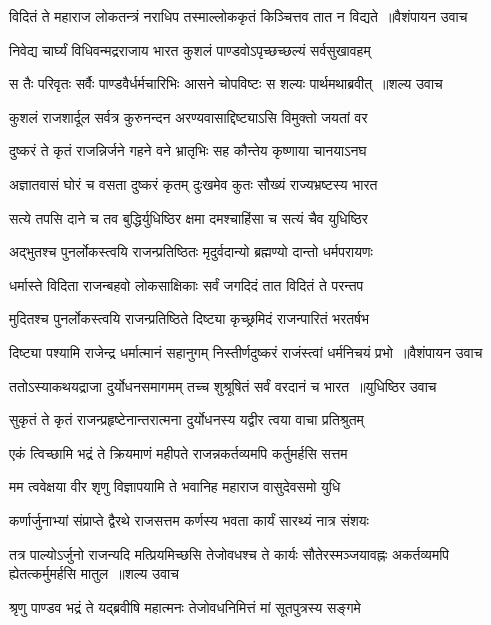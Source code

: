 \threelineshloka
{विदितं ते महाराज लोकतन्त्रं नराधिप}
{तस्माल्लोककृतं किञ्चित्तव तात न विद्यते ॥वैशंपायन उवाच}
{}


\twolineshloka
{निवेद्य चार्घ्यं विधिवन्मद्रराजाय भारत}
{कुशलं पाण्डवोऽपृच्छच्छल्यं सर्वसुखावहम्}


\threelineshloka
{स तैः परिवृतः सर्वैः पाण्डवैर्धर्मचारिभिः}
{आसने चोपविष्टः स शल्यः पार्थमथाब्रवीत् ॥शल्य उवाच}
{}


\twolineshloka
{कुशलं राजशार्दूल सर्वत्र कुरुनन्दन}
{अरण्यवासाद्दिष्ट्याऽसि विमुक्तो जयतां वर}


\twolineshloka
{दुष्करं ते कृतं राजन्निर्जने गहने वने}
{भ्रातृभिः सह कौन्तेय कृष्णाया चानयाऽनघ}


\twolineshloka
{अज्ञातवासं घोरं च वसता दुष्करं कृतम्}
{दुःखमेव कुतः सौख्यं राज्यभ्रष्टस्य भारत}


\twolineshloka
{सत्ये तपसि दाने च तव बुद्धिर्युधिष्ठिर}
{क्षमा दमश्चाहिंसा च सत्यं चैव युधिष्ठिर}


\twolineshloka
{अद्भुतश्च पुनर्लोकस्त्वयि राजन्प्रतिष्ठितः}
{मृदुर्वदान्यो ब्रह्मण्यो दान्तो धर्मपरायणः}


\twolineshloka
{धर्मास्ते विदिता राजन्बहवो लोकसाक्षिकाः}
{सर्वं जगदिदं तात विदितं ते परन्तप}


\twolineshloka
{मुदितश्च पुनर्लोकस्त्वयि राजन्प्रतिष्ठिते}
{दिष्ट्या कृच्छ्रमिदं राजन्पारितं भरतर्षभ}


\threelineshloka
{दिष्ट्या पश्यामि राजेन्द्र धर्मात्मानं सहानुगम्}
{निस्तीर्णदुष्करं राजंस्त्वां धर्मनिचयं प्रभो ॥वैशंपायन उवाच}
{}


\threelineshloka
{ततोऽस्याकथयद्राजा दुर्योधनसमागमम्}
{तच्च शुश्रूषितं सर्वं वरदानं च भारत ॥युधिष्ठिर उवाच}
{}


\twolineshloka
{सुकृतं ते कृतं राजन्प्रहृष्टेनान्तरात्मना}
{दुर्योधनस्य यद्वीर त्वया वाचा प्रतिश्रुतम्}


\twolineshloka
{एकं त्विच्छामि भद्रं ते क्रियमाणं महीपते}
{राजन्नकर्तव्यमपि कर्तुमर्हसि सत्तम}


\twolineshloka
{मम त्ववेक्षया वीर शृणु विज्ञापयामि ते}
{भवानिह महाराज वासुदेवसमो युधि}


\twolineshloka
{कर्णार्जुनाभ्यां संप्राप्ते द्वैरथे राजसत्तम}
{कर्णस्य भवता कार्यं सारथ्यं नात्र संशयः}


\fourlineindentedshloka
{तत्र पाल्योऽर्जुनो राजन्यदि मत्प्रियमिच्छसि}
{तेजोवधश्च ते कार्यः सौतेरस्मञ्जयावह्नः}
{अकर्तव्यमपि ह्येतत्कर्मुमर्हसि मातुल ॥शल्य उवाच}
{}


\twolineshloka
{श्रृणु पाण्डव भद्रं ते यद्ब्रवीषि महात्मनः}
{तेजोवधनिमित्तं मां सूतपुत्रस्य सङ्गमे}


